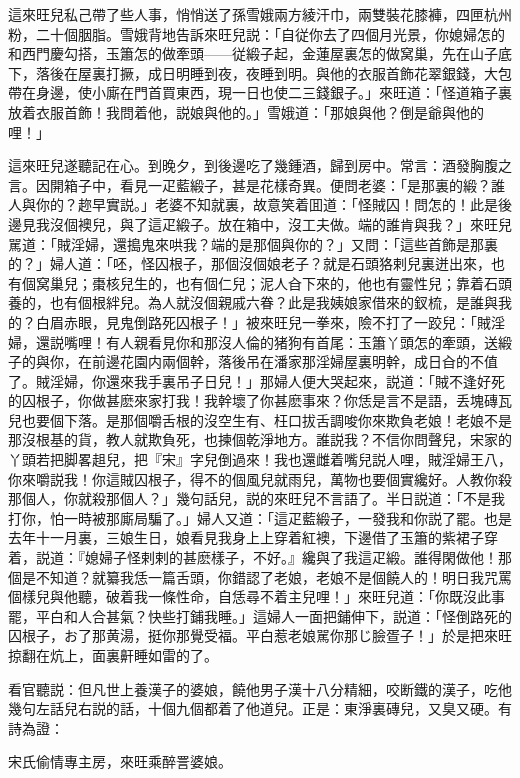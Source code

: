 這來旺兒私己帶了些人事，悄悄送了孫雪娥兩方綾汗巾，兩雙裝花膝褲，四匣杭州粉，二十個胭脂。雪娥背地告訴來旺兒説：「自従你去了四個月光景，你媳婦怎的和西門慶勾搭，玉簫怎的做牽頭——従緞子起，金蓮屋裏怎的做窝巢，先在山子底下，落後在屋裏打撅，成日明睡到夜，夜睡到明。與他的衣服首飾花翠銀錢，大包帶在身邊，使小廝在門首買東西，現一日也使二三錢銀子。」來旺道：「怪道箱子裏放着衣服首飾！我問着他，説娘與他的。」雪娥道：「那娘與他？倒是爺與他的哩！」

這來旺兒遂聽記在心。到晚夕，到後邊吃了幾鍾酒，歸到房中。常言：酒發胸腹之言。因開箱子中，看見一疋藍緞子，甚是花樣奇異。便問老婆：「是那裏的緞？誰人與你的？趂早實説。」老婆不知就裏，故意笑着囬道：「怪賊囚！問怎的！此是後邊見我沒個襖兒，與了這疋緞子。放在箱中，沒工夫做。端的誰肯與我？」來旺兒駡道：「賊淫婦，還搗鬼來哄我？端的是那個與你的？」又問：「這些首飾是那裏的？」婦人道：「呸，怪囚根子，那個沒個娘老子？就是石頭狢剌兒裏迸出來，也有個窝巢兒；棗核兒生的，也有個仁兒；泥人㒲下來的，他也有靈性兒；靠着石頭養的，也有個根絆兒。為人就沒個親戚六眷？此是我姨娘家借來的釵梳，是誰與我的？白眉赤眼，見鬼倒路死囚根子！」被來旺兒一拳來，險不打了一跤兒：「賊淫婦，還説嘴哩！有人親看見你和那沒人倫的猪狗有首尾：玉簫丫頭怎的牽頭，送緞子的與你，在前邊花園内兩個幹，落後吊在潘家那淫婦屋裏明幹，成日㒲的不值了。賊淫婦，你還來我手裏吊子日兒！」那婦人便大哭起來，説道：「賊不逢好死的囚根子，你做甚麽來家打我！我幹壞了你甚麽事來？你恁是言不是語，丢塊磚瓦兒也要個下落。是那個嚼舌根的沒空生有、枉口拔舌調唆你來欺負老娘！老娘不是那沒根基的貨，教人就欺負死，也揀個乾淨地方。誰説我？不信你問聲兒，宋家的丫頭若把脚畧趄兒，把『宋』字兒倒過來！我也還雌着嘴兒説人哩，賊淫婦王八，你來嚼説我！你這賊囚根子，得不的個風兒就雨兒，萬物也要個實纔好。人教你殺那個人，你就殺那個人？」幾句話兒，説的來旺兒不言語了。半日説道：「不是我打你，怕一時被那廝局騙了。」婦人又道：「這疋藍緞子，一發我和你説了罷。也是去年十一月裏，三娘生日，娘看見我身上上穿着紅襖，下邊借了玉簫的紫裙子穿着，説道：『媳婦子怪剌剌的甚麽樣子，不好。』纔與了我這疋緞。誰得閑做他！那個是不知道？就纂我恁一篇舌頭，你錯認了老娘，老娘不是個饒人的！明日我咒罵個樣兒與他聽，破着我一條性命，自恁尋不着主兒哩！」來旺兒道：「你既沒此事罷，平白和人合甚氣？快些打鋪我睡。」這婦人一面把鋪伸下，説道：「怪倒路死的囚根子，お了那黄湯，挺你那覺受福。平白惹老娘駡你那じ臉疍子！」於是把來旺掠翻在炕上，面裏鼾睡如雷的了。

看官聽説：但凡世上養漢子的婆娘，饒他男子漢十八分精細，咬断鐵的漢子，吃他幾句左話兒右説的話，十個九個都着了他道兒。正是：東淨裏磚兒，又臭又硬。有詩為證：

宋氏偷情專主房，來旺乘醉詈婆娘。

